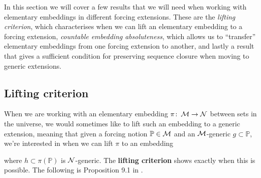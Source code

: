 \documentclass[../../main]{subfiles}
\begin{document}
In this section we will cover a few results that we will need when working with elementary embeddings in different forcing extensions. These are the \textit{lifting criterion}, which characterises when we can lift an elementary embedding to a forcing extension, \textit{countable embedding absoluteness}, which allows us to ``transfer'' elementary embeddings from one forcing extension to another, and lastly a result that gives a sufficient condition for preserving sequence closure when moving to generic extensions.

\subsection{Lifting criterion}
When we are working with an elementary embedding $\pi\colon\operatorname{\mathcal M}\to\operatorname{\mathcal N}$ between sets in the universe, we would sometimes like to lift such an embedding to a generic extension, meaning that given a forcing notion $\mathbb P\in\operatorname{\mathcal M}$ and an $\operatorname{\mathcal M}$-generic $g\subset\mathbb P$, we're interested in when we can lift $\pi$ to an embedding
\eq{
  \pi^+\colon\M[g]\to\N[h],
}

where $h\subset\pi(\mathbb P)$ is $\operatorname{\mathcal N}$-generic. The \textbf{lifting criterion} shows exactly when this is possible. The following is Proposition 9.1 in \cite{handbook-cummings}.

\end{document}
